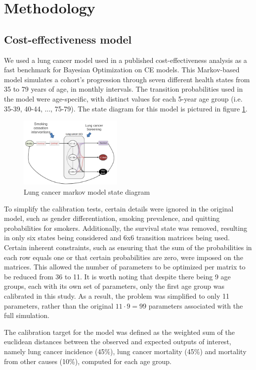 \documentclass{IOS-Book-Article}
\begin{document}
	\section{Methodology}
	\subsection{Cost-effectiveness model}
	We used a lung cancer model used in a published cost-effectiveness analysis\cite{lung-model} as a fast benchmark for Bayesian Optimization on CE models. This Markov-based model simulates a cohort's progression through seven different health states from 35 to 79 years of age, in monthly intervals. The transition probabilities used in the model were age-specific, with distinct values for each 5-year age group (i.e. 35-39, 40-44, ..., 75-79). The state diagram for this model is pictured in figure \ref{fig:lung_model}.
	
	\begin{figure}[h!]
		\centering	
		\includegraphics[width=50mm]{figs/lungmodel.png}		
		\caption{Lung cancer markov model state diagram}	
		\label{fig:lung_model}	
	\end{figure}
	
	To simplify the calibration tests, certain details were ignored in the original model, such as gender differentiation, smoking prevalence, and quitting probabilities for smokers. Additionally, the survival state was removed, resulting in only six states being considered and 6x6 transition matrices being used. Certain inherent constraints, such as ensuring that the sum of the probabilities in each row equals one or that certain probabilities are zero, were imposed on the matrices. This allowed the number of parameters to be optimized per matrix to be reduced from 36 to 11. It is worth noting that despite there being 9 age groups, each with its own set of parameters, only the first age group was calibrated in this study. As a result, the problem was simplified to only 11 parameters, rather than the original $11\cdot 9=99$ parameters associated with the full simulation.
	
	The calibration target for the model was defined as the weighted sum of the euclidean distances between the observed and expected outputs of interest, namely lung cancer incidence (45\%), lung cancer mortality (45\%) and mortality from other causes (10\%), computed for each age group.
	
\end{document}
